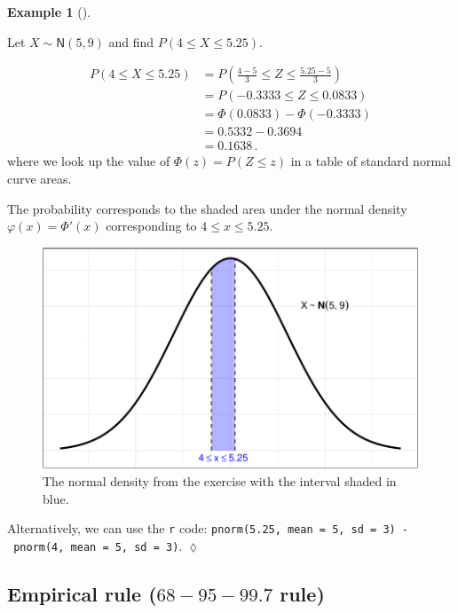 \documentclass[
  a4paper,
  oneside]{book}
\theoremstyle{definition}
\theoremstyle{definition}
\newtheorem{example}{Example}[chapter]
\theoremstyle{definition}
\theoremstyle{plain}
\theoremstyle{remark}
\begin{document}
\begin{example}[]\protect\hypertarget{exm-norm-dt}{}\label{exm-norm-dt}

Let \(X \sim \mathsf{N}(5, 9)\) and find \(P(4 \leq X \leq 5.25)\).

\[
\begin{aligned}
   P(4 \leq X \leq 5.25) &= P\left(\frac{4-5}{3} \leq Z \leq \frac{5.25-5}{3}\right) \\
   &= P(-0.3333 \leq Z \leq 0.0833) \\
   &= \Phi(0.0833) - \Phi(-0.3333) \\
   &= 0.5332 - 0.3694 \\
   &= 0.1638\,.
  \end{aligned}
\] where we look up the value of \(\Phi(z) = P(Z\leq z)\) in a table of
standard normal curve areas.

The probability corresponds to the shaded area under the normal density
\(\varphi(x) = \Phi'(x)\) corresponding to \(4 \leq x \leq 5.25\).

\begin{figure}[H]

{\centering \includegraphics{01-sampling-distributions_files/figure-pdf/example-norm-interval-1.pdf}

}

\caption{The normal density from the exercise with the interval shaded
in blue.}

\end{figure}%

Alternatively, we can use the \texttt{r} code:
\texttt{pnorm(5.25,\ mean\ =\ 5,\ sd\ =\ 3)\ -\ pnorm(4,\ mean\ =\ 5,\ sd\ =\ 3)}.
\(\lozenge\)

\end{example}

\subsection{\texorpdfstring{Empirical rule (\(68-95-99.7\)
rule)}{Empirical rule (68-95-99.7 rule)}}\label{empirical-rule-68-95-99.7-rule}
\end{document}
